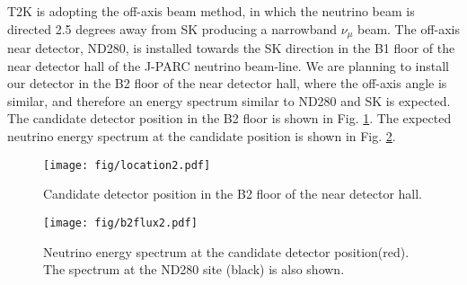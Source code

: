 T2K is adopting the off-axis beam method, in which
the neutrino beam is directed 2.5 degrees away from SK producing a narrowband $\nu_{\mu}$ beam.
The off-axis near detector, ND280, is installed towards the SK direction in the B1 floor of the near detector hall of the J-PARC neutrino beam-line.
We are planning to install our detector in the B2 floor of the near detector hall, 
where the off-axis angle is similar, and therefore an energy spectrum similar to ND280 and SK is expected.
The candidate detector position in the B2 floor is shown in Fig. \ref{fig:location}.
The expected neutrino energy spectrum at the candidate position is shown in Fig. \ref{fig:b2flux}.

\begin{figure}[tbh]
\begin{center}
\texttt{[image: fig/location2.pdf]}
\end{center}
\caption{
Candidate detector position in the B2 floor of the near detector hall.
}
\label{fig:location}
\end{figure}

\begin{figure}[tbh]
\begin{center}
\texttt{[image: fig/b2flux2.pdf]}
\end{center}
\caption{
Neutrino energy spectrum at the candidate detector position(red).
The spectrum at the ND280 site (black) is also shown.
}
\label{fig:b2flux}
\end{figure}
